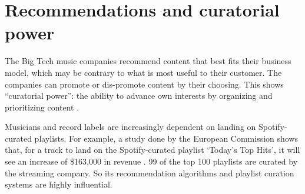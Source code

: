 \section{Recommendations and curatorial power}
\label{sec:problem-description-recommendations}
The Big Tech music companies recommend content that best fits their business model, which may be contrary to what is most useful to their customer. The companies can promote or dis-promote content by their choosing. This shows ``curatorial power'': the ability to advance own interests by organizing and prioritizing content \citep{prey2020locating}.

Musicians and record labels are increasingly dependent on landing on Spotify-curated playlists. For example, a study done by the European Commission shows that, for a track to land on the Spotify-curated playlist `Today's Top Hits', it will see an increase of \$163,000 in revenue \citep{aguiar2018platforms}. 99 of the top 100 playlists are curated by the streaming company. So its recommendation algorithms and playlist curation systems are highly influential. 

